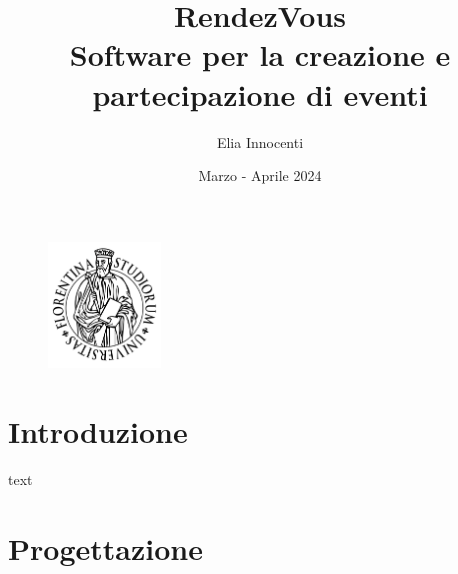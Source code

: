 \documentclass[11pt]{article}
\title{RendezVous \\
\vspace{0.5em}
\large Software per la creazione e partecipazione di eventi} %
\author{Elia Innocenti}
\date{Marzo - Aprile 2024}
\begin{document}

    \maketitle

    \vspace{1em}

    \begin{figure}[h]
        \begin{minipage}{\textwidth}
            \centering
            \includegraphics[width=3cm]{unifi-logo}
        \end{minipage}
        \label{fig:uni-logo}
    \end{figure}



    \newpage

    \tableofcontents


    \newpage

    \section{Introduzione} \label{sec:introduzione}

        text

    \section{Progettazione} \label{sec:progettazione}
\end{document}
